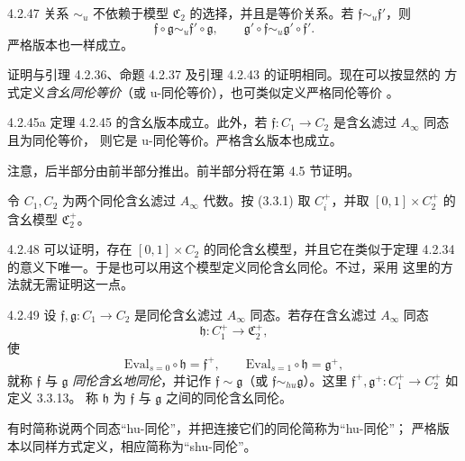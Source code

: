 \begin{lemma}{4.2.47}\label{lem:4-2-47}
关系 $\sim_u$ 不依赖于模型 $\mathfrak C_2$ 的选择，并且是等价关系。若
$\mathfrak f\sim_u\mathfrak f'$，则
\[
 \mathfrak f\circ\mathfrak g\sim_u\mathfrak f'\circ\mathfrak g,
 \qquad
 \mathfrak g'\circ\mathfrak f\sim_u\mathfrak g'\circ\mathfrak f'.
\]
严格版本也一样成立。
\end{lemma}

证明与引理 4.2.36、命题 4.2.37 及引理 4.2.43 的证明相同。现在可以按显然的
方式定义\emph{含幺同伦等价}（或 u-同伦等价），也可类似定义严格同伦等价
。

\begin{theorem}{4.2.45a}\label{thm:4-2-45a}
定理 4.2.45 的含幺版本成立。此外，若
$\mathfrak f\colon C_1\to C_2$ 是含幺滤过 $A_\infty$ 同态且为同伦等价，
则它是 u-同伦等价。严格含幺版本也成立。
\end{theorem}

注意，后半部分由前半部分推出。前半部分将在第 4.5 节证明。

令 $C_1,C_2$ 为两个同伦含幺滤过 $A_\infty$ 代数。按 (3.3.1) 取
$C_i^+$，并取 $[0,1]\times C_2^+$ 的含幺模型
$\mathfrak C_2^+$。

\begin{remark}{4.2.48}\label{rem:4-2-48}
可以证明，存在 $[0,1]\times C_2$ 的同伦含幺模型，并且它在类似于定理
4.2.34 的意义下唯一。于是也可以用这个模型定义同伦含幺同伦。不过，采用
这里的方法就无需证明这一点。
\end{remark}

\begin{definition}{4.2.49}\label{def:4-2-49}
设 $\mathfrak f,\mathfrak g\colon C_1\to C_2$ 是同伦含幺滤过
$A_\infty$ 同态。若存在含幺滤过 $A_\infty$ 同态
\[
 \mathfrak h\colon C_1^+\longrightarrow\mathfrak C_2^+,
\]
使
\[
 \mathrm{Eval}_{s=0}\circ\mathfrak h=\mathfrak f^+,
 \qquad
 \mathrm{Eval}_{s=1}\circ\mathfrak h=\mathfrak g^+,
\]
就称 $\mathfrak f$ 与 $\mathfrak g$ \emph{同伦含幺地同伦}，并记作
$\mathfrak f\sim\mathfrak g$（或
$\mathfrak f\sim_{hu}\mathfrak g$）。这里
$\mathfrak f^+,\mathfrak g^+\colon C_1^+\to C_2^+$ 如定义 3.3.13。
称 $\mathfrak h$ 为 $\mathfrak f$ 与 $\mathfrak g$ 之间的同伦含幺同伦。

有时简称说两个同态“hu-同伦”，并把连接它们的同伦简称为“hu-同伦”；
严格版本以同样方式定义，相应简称为“shu-同伦”。
\end{definition}

